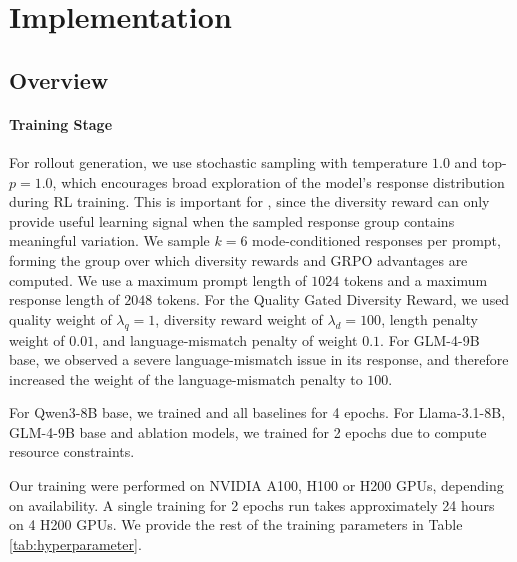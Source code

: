 \section{Implementation}
\label{appx:implementation}

\subsection{Overview}
\label{appx:implementation overview}

\paragraph{Training Stage} For rollout generation, we use stochastic sampling with temperature $1.0$ and top-$p=1.0$, which encourages broad exploration of the model's response distribution during RL training. This is important for \method, since the diversity reward can only provide useful learning signal when the sampled response group contains meaningful variation. We sample $k=6$ mode-conditioned responses per prompt, forming the group over which diversity rewards and GRPO advantages are computed. We use a maximum prompt length of $1024$ tokens and a maximum response length of $2048$ tokens. For the Quality Gated Diversity Reward, we used quality weight of $\lambda_q=1$, diversity reward weight of $\lambda_d=100$, length penalty weight of $0.01$, and language-mismatch penalty of weight  $0.1$. For GLM-4-9B base, we observed a severe language-mismatch issue in its response, and therefore increased the weight of the language-mismatch penalty to $100$.

For Qwen3-8B base, we trained \method{} and all baselines for 4 epochs. For Llama-3.1-8B, GLM-4-9B base and ablation models, we trained for 2 epochs due to compute resource constraints.

Our training were performed on NVIDIA A100, H100 or H200 GPUs, depending on availability. A single training for 2 epochs run takes approximately 24 hours on 4 H200 GPUs.
We provide the rest of the training parameters in Table \ref{tab:hyperparameter}.

